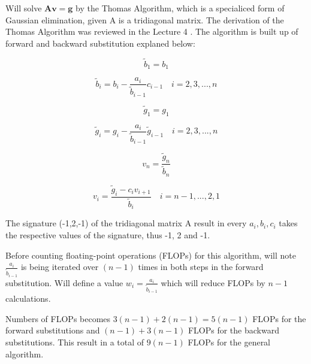 Will solve $\mathbf{A} \mathbf{v} = \mathbf{g}$ by the Thomas Algorithm, which is a specialiced form of Gaussian elimination,   given A is a tridiagonal matrix. The derivation of the Thomas Algorithm was reviewed in the Lecture 4 \cite{lecture_notes}. The algorithm is built up of forward and backward substitution explaned below:


\begin{tcolorbox}[colback=lightgray!20, colframe=black, title=Forward Substitution]
\[
\tilde{b}_1 = b_1
\]

\[
\tilde{b}_i = b_i - \frac{a_i}{\tilde{b}_{i-1}} c_{i-1} \quad i = 2, 3, ..., n
\]

\[
\tilde{g}_1 = g_1
\]

\[
\tilde{g}_i = g_i - \frac{a_i}{\tilde{b}_{i-1}} \tilde{g}_{i-1} \quad i = 2, 3, ..., n
\]
\end{tcolorbox}


\begin{tcolorbox}[colback=lightgray!20, colframe=black, title=Back Substitution]
\[
v_n = \frac{\tilde{g}_n}{\tilde{b}_n}
\]

\[
v_i = \frac{\tilde{g}_i - c_i v_{i+1}}{\tilde{b}_i} \quad i = n-1, ..., 2, 1
\]
\end{tcolorbox}



The signature (-1,2,-1) of the tridiagonal matrix A result in every $a_i, b_i, c_i$ takes the respective values of the signature, thus -1, 2 and -1. 


Before counting floating-point operations (FLOPs) for this algorithm, will note $\frac{a_i}{\tilde{b}_{i-1}}$ is being iterated over $(n-1)$ times in both steps in the forward substitution. Will define a value $w_i = \frac{a_i}{\tilde{b}_{i-1}}$ which will reduce FLOPs by $n-1$ calculations.

Numbers of FLOPs becomes $3(n-1) +  2(n-1) = 5 (n-1)$ FLOPs for the forward substitutions and $(n-1) + 3 (n-1)$ FLOPs for the backward substitutions. This result in a total of $9(n-1)$ FLOPs for the general algorithm.


